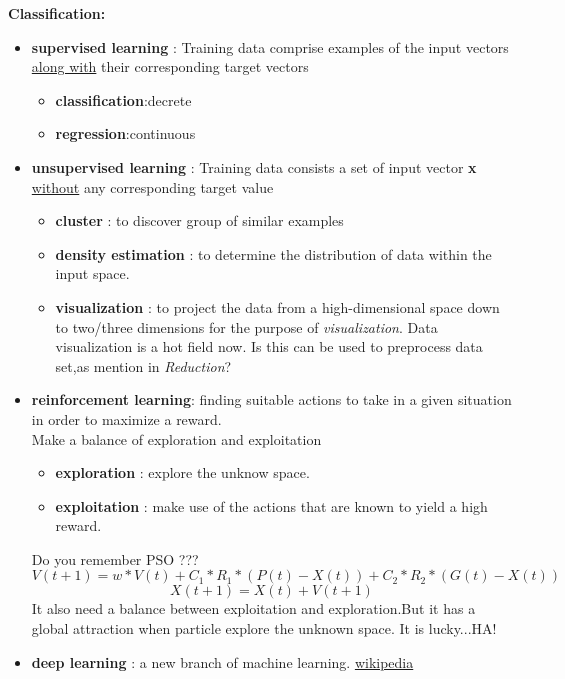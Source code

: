 \documentclass[12pt]{article}
\begin{document}
\textbf{Classification:}
\begin{itemize}
	\item \textbf{supervised learning} : Training data comprise examples of the input vectors \underline{along with} their corresponding target vectors
		\begin{itemize}
			\item \textbf{classification}:decrete
			\item \textbf{regression}:continuous
		\end{itemize}
	\item \textbf{unsupervised learning} : Training data consists a set of input vector \textbf{x} \underline{without} any corresponding target value
		\begin{itemize}
			\item \textbf{cluster} : to discover group of similar examples
			\item \textbf{density estimation} : to determine the distribution of data within the input space.
			\item \textbf{visualization} : to project the data from a high-dimensional space down to two/three dimensions for the purpose of \emph{visualization}. Data visualization is a hot field now. Is this can be used to preprocess data set,as mention in \emph{Reduction}?
		\end{itemize}
	\item \textbf{reinforcement learning}: finding suitable actions to take in a given situation in order to maximize a reward.\\
		Make a balance of exploration and exploitation
		\begin{itemize}
			\item \textbf{exploration} : explore the unknow space.
			\item \textbf{exploitation} : make use of the actions that are known to yield a high reward.
		\end{itemize}
		Do you remember PSO ???
		\begin{equation}
		V(t+1) = w*V(t) + C_{1}*R_{1}*(P(t) - X(t)) + C_{2}*R_{2}*(G(t) - X(t))
		\end{equation}
		\begin{equation}
		X(t+1) = X(t) + V(t+1)
		\end{equation}
		It also need a balance between exploitation and exploration.But it has a global attraction when particle explore the unknown space. It is lucky...HA!
	\item \textbf{deep learning} : a new branch of machine learning. \href{http://en.wikipedia.org/wiki/Deep\_learning}{wikipedia}	
\end{itemize}
\end{document}
